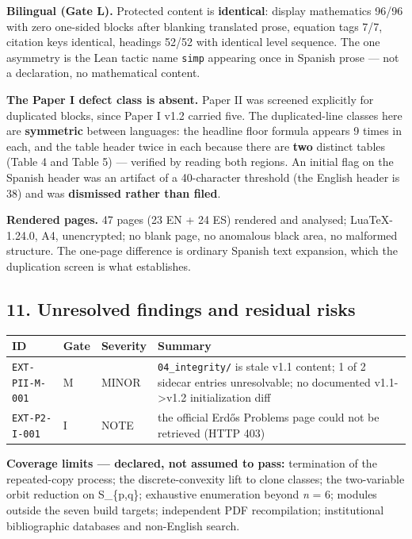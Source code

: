 \documentclass[
  9pt,
  a4paper,
]{article}
\newcounter{none} %
\begin{document}
\textbf{Bilingual (Gate L).} Protected content is \textbf{identical}:
display mathematics 96/96 with zero one-sided blocks after blanking
translated prose, equation tags 7/7, citation keys identical, headings
52/52 with identical level sequence. The one asymmetry is the Lean
tactic name \texttt{simp} appearing once in Spanish prose --- not a
declaration, no mathematical content.

\textbf{The Paper I defect class is absent.} Paper II was screened
explicitly for duplicated blocks, since Paper I v1.2 carried five. The
duplicated-line classes here are \textbf{symmetric} between languages:
the headline floor formula appears 9 times in each, and the table header
twice in each because there are \textbf{two} distinct tables (Table 4
and Table 5) --- verified by reading both regions. An initial flag on
the Spanish header was an artifact of a 40-character threshold (the
English header is 38) and was \textbf{dismissed rather than filed}.

\textbf{Rendered pages.} 47 pages (23 EN + 24 ES) rendered and analysed;
LuaTeX-1.24.0, A4, unencrypted; no blank page, no anomalous black area,
no malformed structure. The one-page difference is ordinary Spanish text
expansion, which the duplication screen is what establishes.

\subsection{11. Unresolved findings and residual
risks}\label{11-unresolved-findings-and-residual-risks}

{\def\LTcaptype{none} %
\begin{longtable}[]{@{}llll@{}}
\toprule\noalign{}
ID & Gate & Severity & Summary \\
\midrule\noalign{}
\endhead
\bottomrule\noalign{}
\endlastfoot
\texttt{EXT-PII-M-001} & M & MINOR & \texttt{04\_integrity/} is stale
v1.1 content; 1 of 2 sidecar entries unresolvable; no documented
v1.1-\textgreater v1.2 initialization diff \\
\texttt{EXT-P2-I-001} & I & NOTE & the official Erdős Problems page
could not be retrieved (HTTP 403) \\
\end{longtable}
}

\textbf{Coverage limits --- declared, not assumed to pass:} termination
of the repeated-copy process; the discrete-convexity lift to clone
classes; the two-variable orbit reduction on S\_\{p,q\}; exhaustive
enumeration beyond \emph{n} = 6; modules outside the seven build
targets; independent PDF recompilation; institutional bibliographic
databases and non-English search.
\end{document}
